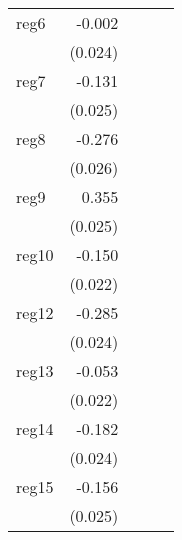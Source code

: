 {\begin{longtable}{l*{4}{D{.}{.}{-1}}}
\addlinespace
reg6        &      -0.002         &                     &                     &                     \\
            &     (0.024)         &                     &                     &                     \\
\addlinespace
reg7        &      -0.131\sym{***}&                     &                     &                     \\
            &     (0.025)         &                     &                     &                     \\
\addlinespace
reg8        &      -0.276\sym{***}&                     &                     &                     \\
            &     (0.026)         &                     &                     &                     \\
\addlinespace
reg9        &       0.355\sym{***}&                     &                     &                     \\
            &     (0.025)         &                     &                     &                     \\
\addlinespace
reg10       &      -0.150\sym{***}&                     &                     &                     \\
            &     (0.022)         &                     &                     &                     \\
\addlinespace
reg12       &      -0.285\sym{***}&                     &                     &                     \\
            &     (0.024)         &                     &                     &                     \\
\addlinespace
reg13       &      -0.053\sym{*}  &                     &                     &                     \\
            &     (0.022)         &                     &                     &                     \\
\addlinespace
reg14       &      -0.182\sym{***}&                     &                     &                     \\
            &     (0.024)         &                     &                     &                     \\
\addlinespace
reg15       &      -0.156\sym{***}&                     &                     &                     \\
            &     (0.025)         &                     &                     &                     \\

\end{longtable}}
